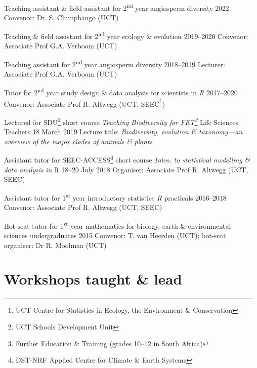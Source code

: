 \documentclass[10pt]{article}
\begin{document}
\begin{hangparas}{2em}{1}

Teaching assistant \& field assistant for 2\textsuperscript{nd} year angiosperm
diversity                                            \hfill 2022 \break
Convenor: Dr. S. Chimphango (UCT)

Teaching \& field assistant for 2\textsuperscript{nd} year ecology \& evolution
                                               \hfill 2019--2020 \break
Convenor: Associate Prof G.A. Verboom (UCT)

Teaching assistant for 2\textsuperscript{nd} year angiosperm diversity
                                               \hfill 2018--2019 \break
Lecturer: Associate Prof G.A. Verboom (UCT)

Tutor for 2\textsuperscript{nd} year study design \& data analysis for 
scientists in \textit{R}                       \hfill 2017--2020 \break
Convenor: Associate Prof R. Altwegg (UCT, SEEC\footnote{UCT Centre for 
Statistics in Ecology, the Environment \& Conservation})

Lectured for SDU\footnote{UCT Schools Development Unit} short course 
\textit{Teaching Biodiversity for FET\footnote{Further Education \& Training
(grades 10--12 in South Africa)}} Life Sciences Teachers
                                            \hfill 18 March 2019 \break
Lecture title: \textit{Biodiversity, evolution \& taxonomy---an overview of the 
major clades of animals \& plants}

Assistant tutor for SEEC-ACCESS\footnote{DST-NRF Applied Centre for Climate \&
Earth Systems} short course \textit{Intro. to statistical modelling \& data 
analysis in} R                           \hfill 18--20 July 2018 \break
Organiser: Associate Prof R. Altwegg (UCT, SEEC)

Assistant tutor for 1\textsuperscript{st} year introductory statistics
\textit{R} practicals                          \hfill 2016--2018 \break
Convenor: Associate Prof R. Altwegg (UCT, SEEC)

Hot-seat tutor for 1\textsuperscript{st} year mathematics for biology, earth \& 
environmental sciences undergraduates                \hfill 2015 \break
Convenor: T. van Heerden (UCT); hot-seat organiser: Dr R. Moolman (UCT)

\end{hangparas}

\clearpage

\section*{Workshops taught \& lead} %
\end{document}
